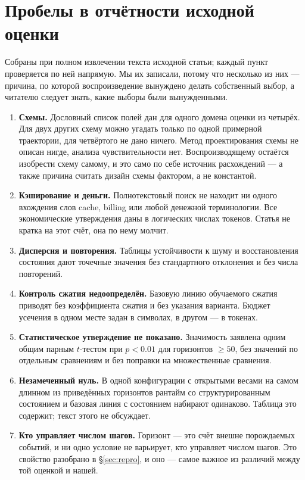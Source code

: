 \section{Пробелы в отчётности исходной оценки}
\label{sec:gaps}

Собраны при полном извлечении текста исходной статьи; каждый пункт
проверяется по ней напрямую\origin. Мы их записали, потому что несколько из
них — причина, по которой воспроизведение вынуждено делать собственный
выбор, а читателю следует знать, какие выборы были вынужденными.

\begin{enumerate}
\item \textbf{Схемы.} Дословный список полей дан для одного домена оценки из
      четырёх. Для двух других схему можно угадать только по одной примерной
      траектории, для четвёртого не дано ничего. Метод проектирования схемы
      не описан нигде, анализа чувствительности нет. Воспроизводящему
      остаётся изобрести схему самому, и это само по себе источник
      расхождений — а также причина считать дизайн схемы фактором, а не
      константой.

\item \textbf{Кэширование и деньги.} Полнотекстовый поиск не находит ни
      одного вхождения слов cache, billing или любой денежной терминологии.
      Все экономические утверждения даны в логических числах токенов.
      Статья не кратка на этот счёт, она по нему молчит.

\item \textbf{Дисперсия и повторения.} Таблицы устойчивости к шуму и
      восстановления состояния дают точечные значения без стандартного
      отклонения и без числа повторений.

\item \textbf{Контроль сжатия недоопределён.} Базовую линию обучаемого
      сжатия приводят без коэффициента сжатия и без указания варианта.
      Бюджет усечения в одном месте задан в символах, в другом — в токенах.

\item \textbf{Статистическое утверждение не показано.} Значимость заявлена
      одним общим парным $t$-тестом при $p<0.01$ для горизонтов $\ge 50$,
      без значений по отдельным сравнениям и без поправки на множественные
      сравнения.

\item \textbf{Незамеченный нуль.} В одной конфигурации с открытыми весами на
      самом длинном из приведённых горизонтов рантайм со структурированным
      состоянием и базовая линия с состоянием набирают одинаково. Таблица
      это содержит; текст этого не обсуждает.

\item \textbf{Кто управляет числом шагов.} Горизонт — это счёт внешне
      порождаемых событий, и ни одно условие не варьирует, кто управляет
      числом шагов. Это свойство разобрано в \S\ref{sec:repro}, и оно —
      самое важное из различий между той оценкой и нашей.
\end{enumerate}
